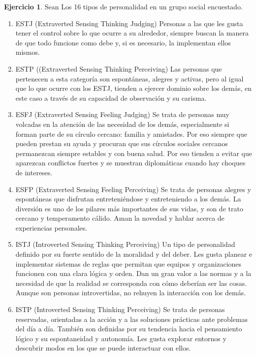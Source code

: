 \documentclass[10pt,]{krantz}
\theoremstyle{definition}
\theoremstyle{definition}
\theoremstyle{definition}
\newtheorem{exercise}{Ejercicio}[chapter]
\theoremstyle{definition}
\theoremstyle{remark}
\begin{document}
\begin{exercise}
\protect\hypertarget{exr:unnamed-chunk-1}{}{\label{exr:unnamed-chunk-1} }Sean Los 16 tipos de personalidad en un grupo social encuestado.

\begin{enumerate}
\def\labelenumi{\arabic{enumi}.}
\item
  ESTJ (Extraverted Sensing Thinking Judging)
  Personas a las que les gusta tener el control sobre lo que ocurre a su alrededor, siempre buscan la manera de que todo funcione como debe y, si es necesario, la implementan ellos mismos.
\item
  ESTP ((Extraverted Sensing Thinking Perceiving)
  Las personas que pertenecen a esta categoría son espontáneas, alegres y activas, pero al igual que lo que ocurre con los ESTJ, tienden a ejercer dominio sobre los demás, en este caso a través de su capacidad de observación y su carisma.
\item
  ESFJ (Extraverted Sensing Feeling Judging)
  Se trata de personas muy volcadas en la atención de las necesidad de los demás, especialmente si forman parte de su círculo cercano: familia y amistades. Por eso siempre que pueden prestan su ayuda y procuran que sus círculos sociales cercanos permanezcan siempre estables y con buena salud. Por eso tienden a evitar que aparezcan conflictos fuertes y se muestran diplomáticas cuando hay choques de intereses.
\item
  ESFP (Extraverted Sensing Feeling Perceiving)
  Se trata de personas alegres y espontáneas que disfrutan entreteniéndose y entreteniendo a los demás. La diversión es uno de los pilares más importantes de sus vidas, y son de trato cercano y temperamento cálido. Aman la novedad y hablar acerca de experiencias personales.
\item
  ISTJ (Introverted Sensing Thinking Perceiving)
  Un tipo de personalidad definido por su fuerte sentido de la moralidad y del deber. Les gusta planear e implementar sistemas de reglas que permitan que equipos y organizaciones funcionen con una clara lógica y orden. Dan un gran valor a las normas y a la necesidad de que la realidad se corresponda con cómo deberían ser las cosas. Aunque son personas introvertidas, no rehuyen la interacción con los demás.
\item
  ISTP (Introverted Sensing Thinking Perceiving)
  Se trata de personas reservadas, orientadas a la acción y a las soluciones prácticas ante problemas del día a día. También son definidas por su tendencia hacia el pensamiento lógico y su espontaneidad y autonomía. Les gusta explorar entornos y descubrir modos en los que se puede interactuar con ellos.

\end{enumerate}
\end{exercise}
\end{document}
